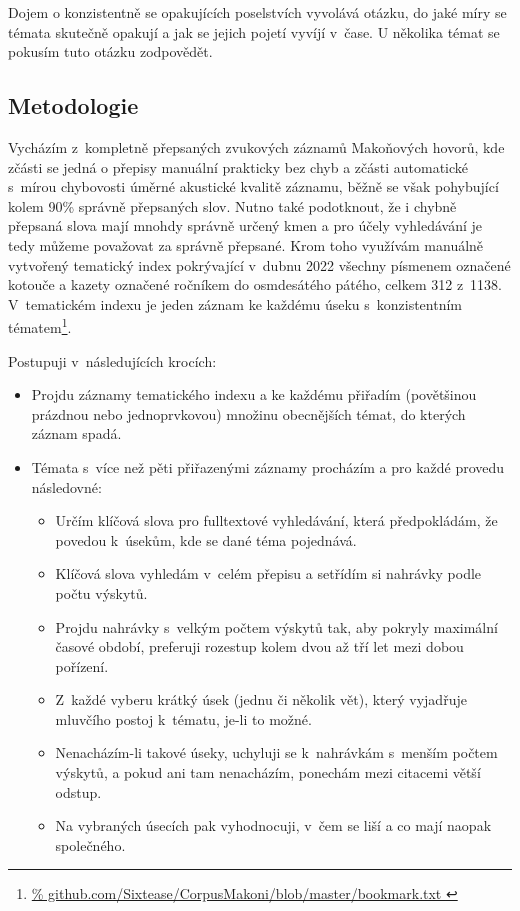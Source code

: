 Dojem o konzistentně se opakujících poselstvích vyvolává otázku, do jaké míry se
témata skutečně opakují a jak se jejich pojetí vyvíjí v~čase. U několika témat
se pokusím tuto otázku zodpovědět.

\subsection{Metodologie}

Vycházím z~kompletně přepsaných zvukových záznamů Makoňových hovorů, kde zčásti
se jedná o přepisy manuální prakticky bez chyb a zčásti automatické s~mírou
chybovosti úměrné akustické kvalitě záznamu, běžně se však pohybující kolem 90\%
správně přepsaných slov. Nutno také podotknout, že i chybně přepsaná slova mají
mnohdy správně určený kmen a pro účely vyhledávání je tedy můžeme považovat za
správně přepsané. Krom toho využívám manuálně vytvořený tematický index
pokrývající v~dubnu 2022 všechny písmenem označené kotouče a kazety označené
ročníkem do osmdesátého pátého, celkem 312 z~1138. V~tematickém indexu je jeden
záznam ke každému úseku s~konzistentním tématem\footnote{\url{%
github.com/Sixtease/CorpusMakoni/blob/master/bookmark.txt
}}.

Postupuji v~následujících krocích:
\begin{itemize}
\item{
Projdu záznamy tematického indexu a ke každému přiřadím (povětšinou prázdnou nebo jednoprvkovou) množinu
obecnějších témat, do kterých záznam spadá.
}
\item{
Témata s~více než pěti přiřazenými záznamy procházím a pro každé provedu
následovné:
\begin{itemize}
\item{
Určím klíčová slova pro fulltextové vyhledávání, která předpokládám, že povedou
k~úsekům, kde se dané téma pojednává.
}
\item{
Klíčová slova vyhledám v~celém přepisu a setřídím si nahrávky podle počtu
výskytů.
}
\item{
Projdu nahrávky s~velkým počtem výskytů tak, aby pokryly maximální časové
období, preferuji rozestup kolem dvou až tří let mezi dobou pořízení.
}
\item{
Z~každé vyberu krátký úsek (jednu či několik vět), který vyjadřuje mluvčího
postoj k~tématu, je-li to možné.
}
\item{
Nenacházím-li takové úseky, uchyluji se k~nahrávkám s~menším počtem výskytů, a
pokud ani tam nenacházím, ponechám mezi citacemi větší odstup.
}
\item{
Na vybraných úsecích pak vyhodnocuji, v~čem se liší a co mají naopak
společného.
}
\end{itemize}
}
\end{itemize}

